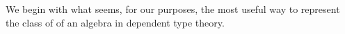 
We begin with what seems, for our purposes, the most useful way to represent the class of  of an algebra in dependent type theory.
\ccpad
\begin{code}%
\>[1]\AgdaSpace{}%
\AgdaSymbol{:}\AgdaSpace{}%
\AgdaSymbol{\{}\AgdaSpace{}%
\AgdaSymbol{:}\AgdaSpace{}%
\AgdaSpace{}%
\AgdaSpace{}%
\AgdaSymbol{\}(}\AgdaSpace{}%
\AgdaSymbol{:}\AgdaSpace{}%
\AgdaSpace{}%
\AgdaSpace{}%
\AgdaSymbol{)(}\AgdaSpace{}%
\AgdaSymbol{:}\AgdaSpace{}%
\AgdaSpace{}%
\AgdaSpace{}%
\AgdaSymbol{)}\AgdaSpace{}%
\AgdaSpace{}%
\AgdaSpace{}%
\AgdaSpace{}%
\AgdaSpace{}%
\AgdaSpace{}%
\AgdaSpace{}%
\AgdaSpace{}%
\AgdaSpace{}%
\<%
\\
%
\>[1]\AgdaSpace{}%
\AgdaSpace{}%
\AgdaSpace{}%
\AgdaSymbol{=}\AgdaSpace{}%
\AgdaSpace{}%
\AgdaSpace{}%
\AgdaSpace{}%
\AgdaSpace{}%
\AgdaSpace{}%
\AgdaSpace{}%
\AgdaSpace{}%
\AgdaSpace{}%
\<%
\\
%
\\[\AgdaEmptyExtraSkip]%
%
\>[1]\AgdaSpace{}%
\AgdaSymbol{:}\AgdaSpace{}%
\AgdaSpace{}%
\AgdaSpace{}%
\AgdaSpace{}%
\AgdaSpace{}%
\AgdaSpace{}%
\AgdaSpace{}%
\AgdaSpace{}%
\AgdaSpace{}%
\AgdaSpace{}%
\AgdaSpace{}%
\AgdaSpace{}%
\AgdaSpace{}%
\<%
\\
%
\>[1]\AgdaSpace{}%

\end{code}
